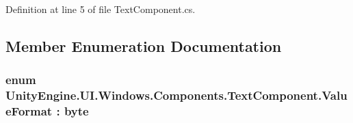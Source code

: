 Definition at line 5 of file Text\+Component.\+cs.



\subsection{Member Enumeration Documentation}
\hypertarget{class_unity_engine_1_1_u_i_1_1_windows_1_1_components_1_1_text_component_adf4a7bac85dfe1b32ebe6309e5386f89}{}
\subsubsection[{Value\+Format}]{\setlength{\rightskip}{0pt plus 5cm}enum {\bf Unity\+Engine.\+U\+I.\+Windows.\+Components.\+Text\+Component.\+Value\+Format} \+: byte}\label{class_unity_engine_1_1_u_i_1_1_windows_1_1_components_1_1_text_component_adf4a7bac85dfe1b32ebe6309e5386f89}
